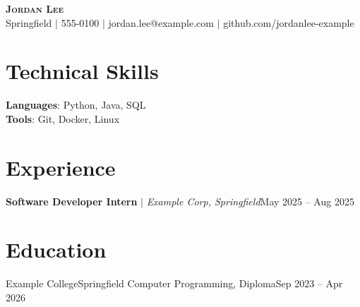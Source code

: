 \begin{center}
    \textbf{\Huge \scshape Jordan Lee} \\ \vspace{1pt}
    \small Springfield $|$ 555-0100 $|$ jordan.lee@example.com $|$ github.com/jordanlee-example
\end{center}

\section{Technical Skills}
 \begin{itemize}[leftmargin=0.15in, label={}]
    \small{\item{
     \textbf{Languages}{: Python, Java, SQL} \\
     \textbf{Tools}{: Git, Docker, Linux}
    }}
 \end{itemize}

\section{Experience}
  \resumeSubHeadingListStart
    \resumeJobHeading
          {\textbf{Software Developer Intern} $|$ \small\emph{Example Corp, Springfield}}{May 2025 -- Aug 2025}
      \resumeItemListStart
      \resumeItemListEnd
  \resumeSubHeadingListEnd

\section{Education}
  \resumeSubHeadingListStart
    \resumeSubheading
      {Example College}{Springfield}
      {Computer Programming, Diploma}{Sep 2023 -- Apr 2026}
  \resumeSubHeadingListEnd
